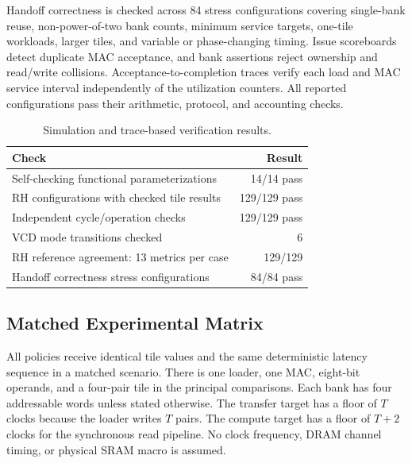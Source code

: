 \documentclass[twocolumn,10pt]{article}
\begin{document}
Handoff correctness is checked across 84 stress configurations covering
single-bank reuse, non-power-of-two bank counts, minimum service targets,
one-tile workloads, larger tiles, and variable or phase-changing timing.
Issue scoreboards detect duplicate MAC acceptance, and bank assertions
reject ownership and read/write collisions. Acceptance-to-completion traces
verify each load and MAC service interval independently of the utilization
counters. All reported configurations pass their arithmetic,
protocol, and accounting checks.

\begin{table}[t]
\centering\caption{Simulation and trace-based verification results.}
\label{tab:verification}\scriptsize
\setlength{\tabcolsep}{3pt}
\begin{tabular}{p{}r}
\toprule
Check & Result\\
\midrule
Self-checking functional parameterizations & 14/14 pass\\
RH configurations with checked tile results & 129/129 pass\\
Independent cycle/operation checks & 129/129 pass\\
VCD mode transitions checked & 6\\
RH reference agreement: 13 metrics per case & 129/129\\
Handoff correctness stress configurations & 84/84 pass\\
\bottomrule
\end{tabular}
\end{table}

\subsection{Matched Experimental Matrix}
All policies receive identical tile values and the same deterministic
latency sequence in a matched scenario. There is one loader, one MAC,
eight-bit operands, and a four-pair tile in the principal comparisons.
Each bank has four addressable words unless stated otherwise. The transfer
target has a floor of $T$ clocks because the loader writes $T$ pairs. The
compute target has a floor of $T+2$ clocks for the synchronous read pipeline.
No clock frequency, DRAM channel timing, or physical SRAM macro is assumed.
\end{document}

